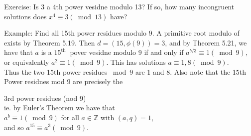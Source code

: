 \documentclass[10pt]{article}
\begin{document}
Exercise: Is 3 a 4th power vesidne modulo 13? If so, how many incongruent solutions does $x^{4} \equiv 3(\bmod 13)$ have?

Example: Find all 15th power residues modulo 9. A primitive root modulo of exists by Theorem 5.19. Then $d=(15, \phi(9)) =3$, and by Theorem 5.21, we have that $a$ is a $15^{\text {th }}$ pover vesidne modulo 9 if and only if $a^{b / 3} \equiv 1(\bmod 9)$, or equivalently $a^{2} \equiv 1(\bmod 9)$. This has solutions $a \equiv 1,8(\bmod 9)$.\\
Thus the two 15th power residues $\bmod 9$ are 1 and 8. Also note that the 15th Power residnes mod 9 are precisely the

3rd power residues (nod 9)\\
ie. by Euler's Theorem we have that\\
$a^{b} \equiv 1(\bmod 9)$ for all $a \in \mathbb{Z}$ with $(a, q)=1$,\\
and so $a^{15} \equiv a^{3}(\bmod 9)$.
\end{document}
